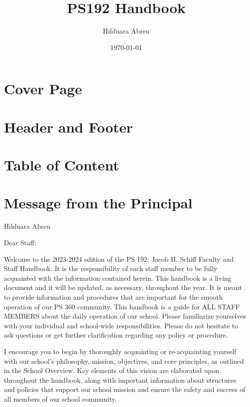 \documentclass[letterpaper, 11pt]{article}
\author{Hilduara Abreu}
\date{\today}
\title{PS192 Handbook}
\begin{document}
\maketitle
\tableofcontents


\section{Cover Page}
\label{sec:orgb27ec8f}
\thispagestyle{empty}


\section{Header and Footer}
\label{sec:org86e64d1}
\pagenumbering{\fancyhf{}}
\pagestyle{headings}
\fancyhead[L]{\textit{\rightmark}}
\fancyhead[R]{\thepage}
\pagestyle{fancy}
\renewcommand{\footrulewidth}{1px}

\section{Table of Content}
\label{sec:orgebb1470}
\setcounter{tocdepth}{2}
\tableofcontents

\section{Message from the Principal}
\label{sec:orgd41795e}
Hilduara Abreu

Dear Staff:

Welcome to the 2023-2024 edition of the PS 192: Jacob H. Schiff Faculty and Staff Handbook. It is the responsibility of each staff member to be fully acquainted with the information contained herein. This handbook is a living document and it will be updated, as necessary, throughout the year. It is meant to provide information and procedures that are important for the smooth operation of our PS 360 community. This handbook is a guide for ALL STAFF MEMBERS about the daily operation of our school. Please familiarize yourselves with your individual and school-wide responsibilities. Please do not hesitate to ask questions or get further clarification regarding any policy or procedure.

I encourage you to begin by thoroughly acquainting or re-acquainting yourself with our school’s philosophy, mission, objectives, and core principles, as outlined in the School Overview. Key elements of this vision are elaborated upon throughout the handbook, along with important information about structures and policies that support our school mission and ensure the safety and success of all members of our school community.
\end{document}
